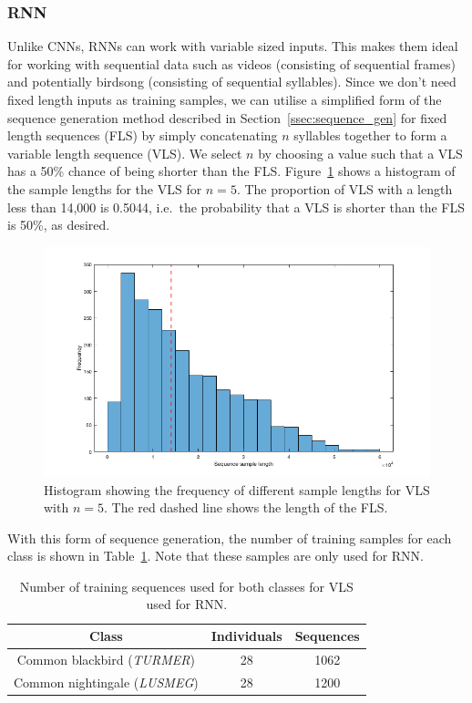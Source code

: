 \subsubsection{RNN}\label{sssec:method:rnn}

Unlike CNNs, RNNs can work with variable sized inputs. This makes them ideal for
working with sequential data such as videos (consisting of sequential frames) and
potentially birdsong (consisting of sequential syllables). Since we don't need
fixed length inputs as training samples, we can utilise a simplified form of the
sequence generation method described in Section~\ref{ssec:sequence_gen} for
fixed length sequences (FLS) by simply concatenating $n$ syllables together to
form a variable length sequence (VLS). We select $n$ by choosing a value such
that a VLS has a 50\% chance of being shorter than the FLS\@.
Figure~\ref{fig:vls_lengths} shows a histogram of the sample lengths for the VLS
for $n=5$. The proportion of VLS with a length less than 14,000 is 0.5044, i.e.\
the probability that a VLS is shorter than the FLS is 50\%, as desired.

\begin{figure}[ht]
  \centering
  \includegraphics[width=\textwidth]{figures/vls_lengths.png}
  \caption{Histogram showing the frequency of different sample lengths for VLS
  with $n=5$. The red dashed line shows the length of the
FLS.}\label{fig:vls_lengths}
\end{figure}

With this form of sequence generation, the number of training samples for
each class is shown in Table~\ref{table:vls_training_samples}. Note that these
samples are only used for RNN\@.

\begin{table}[ht]
\begin{center}
\begin{tabular}{c c c}
\toprule
Class & Individuals & Sequences \\ [0.5ex]
\midrule
Common blackbird (\textit{TURMER}) & 28 & 1062 \\
Common nightingale (\textit{LUSMEG}) & 28 & 1200 \\
\bottomrule
\end{tabular}
\caption{Number of training sequences used for both
classes for VLS used for RNN.}\label{table:vls_training_samples}
\end{center}
\end{table}

